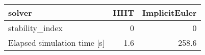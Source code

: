 \begin{tabular}{lrr}
\hline
 solver                      &   HHT &   ImplicitEuler \\
\hline
 stability\_index             &   0   &             0   \\
 Elapsed simulation time [s] &   1.6 &           258.6 \\
\hline
\end{tabular}